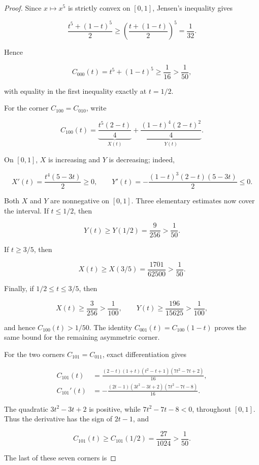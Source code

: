 \documentclass[11pt]{article}
\theoremstyle{definition}
\begin{document}
\begin{proof}
Since \(x\mapsto x^5\) is strictly convex on \([0,1]\), Jensen's inequality
gives

\[
\frac{t^5+(1-t)^5}{2}
\ge\left(\frac{t+(1-t)}2\right)^5
=\frac1{32}.
\]

Hence

\[
C_{000}(t)=t^5+(1-t)^5\ge\frac1{16}>\frac1{50},         \tag{4.1}
\]

with equality in the first inequality exactly at \(t=1/2\).

For the corner \(C_{100}=C_{010}\), write

\[
C_{100}(t)=
\underbrace{\frac{t^5(2-t)}4}_{X(t)}
+\underbrace{\frac{(1-t)^4(2-t)^2}{4}}_{Y(t)}.          \tag{4.2}
\]

On \([0,1]\), \(X\) is increasing and \(Y\) is decreasing; indeed,

\[
X'(t)=\frac{t^4(5-3t)}2\ge0,
\qquad
Y'(t)=-\frac{(1-t)^3(2-t)(5-3t)}2\le0.
\]

Both \(X\) and \(Y\) are nonnegative on \([0,1]\). Three elementary estimates
now cover the interval. If \(t\le1/2\), then

\[
Y(t)\ge Y(1/2)=\frac9{256}>\frac1{50}.
\]

If \(t\ge3/5\), then

\[
X(t)\ge X(3/5)=\frac{1701}{62500}>\frac1{50}.
\]

Finally, if \(1/2\le t\le3/5\), then

\[
X(t)\ge\frac3{256}>\frac1{100},
\qquad
Y(t)\ge\frac{196}{15625}>\frac1{100},
\]

and hence \(C_{100}(t)>1/50\). The identity
\(C_{001}(t)=C_{100}(1-t)\) proves the same bound for the remaining asymmetric
corner.

For the two corners \(C_{101}=C_{011}\), exact differentiation gives

\[
\begin{aligned}
C_{101}(t)
&=\frac{(2-t)(1+t)(t^2-t+1)(7t^2-7t+2)}{16},\\
C_{101}'(t)
&=-\frac{(2t-1)(3t^2-3t+2)(7t^2-7t-8)}{16}.
\end{aligned}                                             \tag{4.3}
\]

The quadratic \(3t^2-3t+2\) is positive, while
\(7t^2-7t-8<0\), throughout \([0,1]\). Thus the derivative has the sign of
\(2t-1\), and

\[
C_{101}(t)\ge C_{101}(1/2)=\frac{27}{1024}>\frac1{50}.
\]

The last of these seven corners is


\end{proof}
\end{document}
